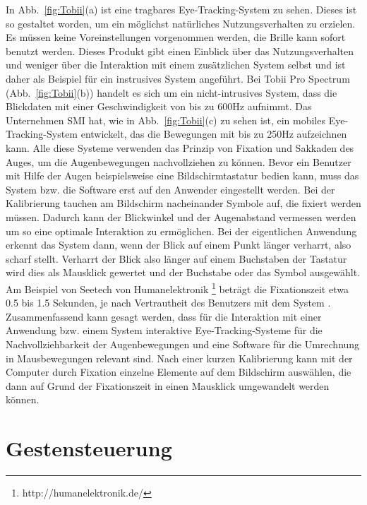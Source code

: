In Abb.~\ref{fig:Tobii}(a) ist eine tragbares Eye-Tracking-System zu sehen. Dieses ist so gestaltet worden, um ein möglichst natürliches Nutzungsverhalten zu erzielen. Es müssen keine Voreinstellungen vorgenommen werden, die Brille kann sofort benutzt werden. Dieses Produkt gibt einen Einblick über das Nutzungsverhalten und weniger über die Interaktion mit einem zusätzlichen System selbst und ist daher als Beispiel für ein instrusives System angeführt. Bei Tobii Pro Spectrum (Abb.~\ref{fig:Tobii}(b)) handelt es sich um ein nicht-intrusives System, dass die Blickdaten mit einer Geschwindigkeit von bis zu 600Hz aufnimmt. Das Unternehmen SMI hat, wie in Abb.~\ref{fig:Tobii}(c) zu sehen ist, ein mobiles Eye-Tracking-System entwickelt, das die Bewegungen mit bis zu 250Hz aufzeichnen kann. 
Alle diese Systeme verwenden das Prinzip von Fixation und Sakkaden des Auges, um die Augenbewegungen nachvollziehen zu können.
\newline \newline
Bevor ein Benutzer mit Hilfe der Augen beispielsweise eine Bildschirmtastatur bedien kann, muss das System bzw. die Software erst auf den Anwender eingestellt werden. Bei der Kalibrierung tauchen am Bildschirm nacheinander Symbole auf, die fixiert werden müssen. Dadurch kann der Blickwinkel und der Augenabstand vermessen werden um so eine optimale Interaktion zu ermöglichen. 
Bei der eigentlichen Anwendung erkennt das System dann, wenn der Blick auf einem Punkt länger verharrt, also scharf stellt. Verharrt der Blick also länger auf einem Buchstaben der Tastatur wird dies als Mausklick gewertet und der Buchstabe oder das Symbol ausgewählt. Am Beispiel von Seetech von Humanelektronik %
\footnote{http://humanelektronik.de/}
%
beträgt die Fixationszeit etwa 0.5 bis 1.5 Sekunden, je nach Vertrautheit des Benutzers mit dem System \cite{SEETECH}.
\newline \newline
Zusammenfassend kann gesagt werden, dass für die Interaktion mit einer Anwendung bzw. einem System interaktive Eye-Tracking-Systeme für die Nachvollziehbarkeit der Augenbewegungen und eine Software für die Umrechnung in Mausbewegungen relevant sind. Nach einer kurzen Kalibrierung kann mit der Computer durch Fixation einzelne Elemente auf dem Bildschirm auswählen, die dann auf Grund der Fixationszeit in einen Mausklick umgewandelt werden können.

\section{Gestensteuerung}

